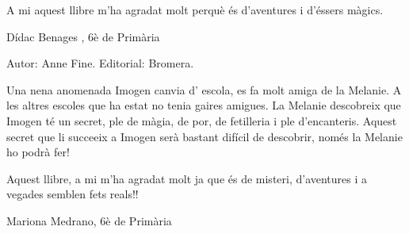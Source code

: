 \begin{shortnews}
{A mi aquest llibre m’ha agradat molt perquè és d’aventures i d’éssers màgics.

Dídac Benages , 6è de Primària
}

{
Autor: Anne Fine. Editorial: Bromera.

Una nena anomenada Imogen canvia d’ escola, es fa  molt amiga de la Melanie. A les altres escoles que ha estat no tenia gaires amigues. La Melanie descobreix que Imogen té un secret, ple de màgia, de por, de fetilleria i ple d’encanteris. Aquest secret que li succeeix a Imogen serà bastant difícil de descobrir, només la Melanie ho podrà fer!

Aquest llibre, a mi m’ha agradat molt ja que és de misteri, d’aventures i a vegades semblen fets reals!!

Mariona Medrano, 6è de Primària
}

\end{shortnews}

